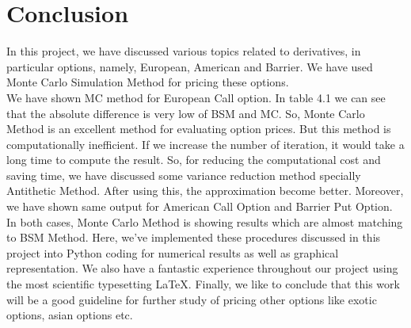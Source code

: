 \chapter{Conclusion}
	\noindent In this project, we have discussed various topics related to derivatives, in particular options, namely, European, American and Barrier. We have used Monte Carlo Simulation Method for pricing these options. \\[2mm]
	
	\noindent We have shown MC method for European Call option. In table 4.1 we can see that the absolute difference is very low of BSM and MC. So, Monte Carlo Method is an excellent method for evaluating option prices. But this method is computationally inefficient. If we increase the number of iteration, it would take a long time to compute the result. So, for reducing the computational cost and saving time, we have discussed some variance reduction method specially Antithetic Method. After using this, the approximation become better. 
	\noindent Moreover, we have shown same output for American Call Option and Barrier Put Option. In both cases, Monte Carlo Method is showing results which are almost matching to BSM Method. 
	\noindent Here, we’ve implemented these procedures discussed in this
	project into Python coding for numerical results as well as graphical representation. We also have a fantastic experience throughout our project
	using the most scientific typesetting  \LaTeX . Finally, we like to conclude that this
	work will be a good guideline for further study of pricing other options like exotic
	options, asian options etc.